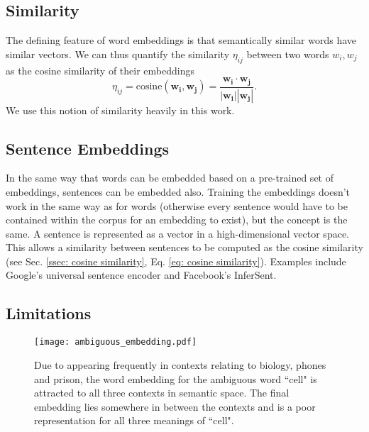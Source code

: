     \subsection{Similarity \label{ssec: cosine similarity}}
        The defining feature of word \glspl{embedding} is that semantically similar words have similar vectors. We can thus quantify the similarity $\eta_{ij}$ between two words $w_i, w_j$ as the cosine similarity of their \glspl{embedding}
        \begin{equation}
            \eta_{ij} = \text{cosine}(\mathbf{w_i}, \mathbf{w_j}) = \frac{\mathbf{w_i} \cdot \mathbf{w_j}}{|\mathbf{w_i}| |\mathbf{w_j}|}.
            \label{eq: cosine similarity}
        \end{equation}
        We use this notion of similarity heavily in this work.

    \subsection{Sentence Embeddings \label{ssec: utterance embeddings}}

    In the same way that words can be embedded based on a pre-trained set of \glspl{embedding}, sentences can be embedded also. Training the \glspl{embedding} doesn't work in the same way as for words (otherwise every sentence would have to be contained within the corpus for an \gls{embedding} to exist), but the concept is the same. A sentence is represented as a vector in a high-dimensional vector space. This allows a similarity between sentences to be computed as the cosine similarity (see Sec. \ref{ssec: cosine similarity}, Eq. \ref{eq: cosine similarity}). Examples include Google's universal sentence encoder\cite{GoogleEncoder} and Facebook's InferSent\cite{infersent}.

    \subsection{Limitations}
        \begin{figure}[ht]
            \centering
            \texttt{[image: ambiguous\_embedding.pdf]}
            \caption{Due to appearing frequently in contexts relating to biology, phones and prison, the word \gls{embedding} for the ambiguous word ``cell" is attracted to all three contexts in semantic space. The final \gls{embedding} lies somewhere in between the contexts and is a poor representation for all three meanings of ``cell".}
            \label{fig:ambiguous_embedding}
        \end{figure}

